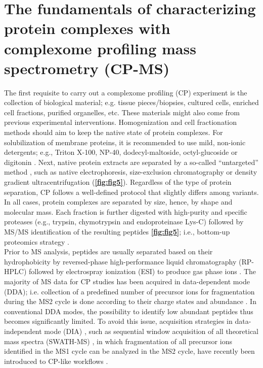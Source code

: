 \section{The fundamentals of characterizing protein complexes with complexome profiling mass spectrometry (CP-MS)} \label{sec:CP_MS_intro}
The first requisite to carry out a complexome profiling (CP) experiment is the collection of biological material; e.g. tissue pieces/biopsies, cultured cells, enriched cell fractions, purified organelles, etc. These materials might also come from previous experimental interventions. Homogenization and cell fractionation methods should aim to keep the native state of protein complexes. For solubilization of membrane proteins, it is recommended to use mild, non-ionic detergents; e.g., Triton X-100, NP-40, dodecyl-maltoside, octyl-glucoside or digitonin \cite{Eubel_2005, Wittig_2006}. Next, native protein extracts are separated by a so-called “untargeted” method \cite{Iacobucci_2021}, such as native electrophoresis, size-exclusion chromatography or density gradient ultracentrifugation (\textbf{\autoref{fig:fig5}}). Regardless of the type of protein separation, CP follows a well-defined protocol that slightly differs among variants. In all cases, protein complexes are separated by size, hence, by shape and molecular mass. Each fraction is further digested with high-purity and specific proteases (e.g., trypsin, chymotrypsin and endoproteinase Lys-C) followed by MS/MS identification of the resulting peptides \textbf{\autoref{fig:fig5}}; i.e., bottom-up proteomics strategy \cite{Zhang_2013}.\\
Prior to MS analysis, peptides are usually separated based on their hydrophobicity by reversed-phase high-performance liquid chromatography (RP-HPLC) followed by electrospray ionization (ESI) to produce gas phase ions \cite{Zhang_2013}. The majority of MS data for CP studies has been acquired in data-dependent mode (DDA); i.e. collection of a predefined number of precursor ions for fragmentation during the MS2 cycle is done according to their charge states and abundance \cite{Hu_2016}. In conventional DDA modes, the possibility to identify low abundant peptides thus becomes significantly limited. To avoid this issue, acquisition strategies in data-independent mode (DIA) \cite{Krasny_2021}, such as sequential window acquisition of all theoretical mass spectra (SWATH-MS) \cite{Gillet_2012}, in which fragmentation of all precursor ions identified in the MS1 cycle can be analyzed in the MS2 cycle, have recently been introduced to CP-like workflows \cite{Bludau_2020, Calvo_2020, Heusel_2019}.\\ 
